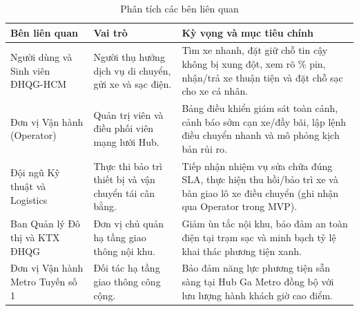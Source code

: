 \begin{table}[H]
\centering
\caption{Phân tích các bên liên quan}
\label{tab:stakeholders}
\begin{tabularx}{\textwidth}{>{\raggedright\arraybackslash}p{3.7cm} >{\raggedright\arraybackslash}p{4.3cm} >{\raggedright\arraybackslash}X}
\toprule
\textbf{Bên liên quan} & \textbf{Vai trò} & \textbf{Kỳ vọng và mục tiêu chính} \\
\midrule
Người dùng và Sinh viên ĐHQG-HCM & Người thụ hưởng dịch vụ di chuyển, gửi xe và sạc điện. & Tìm xe nhanh, đặt giữ chỗ tin cậy không bị xung đột, xem rõ \% pin, nhận/trả xe thuận tiện và đặt chỗ sạc cho xe cá nhân. \\
\addlinespace[3pt]
Đơn vị Vận hành (Operator) & Quản trị viên và điều phối viên mạng lưới Hub. & Bảng điều khiển giám sát toàn cảnh, cảnh báo sớm cạn xe/đầy bãi, lập lệnh điều chuyển nhanh và mô phỏng kịch bản rủi ro. \\
\addlinespace[3pt]
Đội ngũ Kỹ thuật và Logistics & Thực thi bảo trì thiết bị và vận chuyển tái cân bằng. & Tiếp nhận nhiệm vụ sửa chữa đúng SLA, thực hiện thu hồi/bảo trì xe và bàn giao lô xe điều chuyển (ghi nhận qua Operator trong MVP). \\
\addlinespace[3pt]
Ban Quản lý Đô thị và KTX ĐHQG & Đơn vị chủ quản hạ tầng giao thông nội khu. & Giảm ùn tắc nội khu, bảo đảm an toàn điện tại trạm sạc và minh bạch tỷ lệ khai thác phương tiện xanh. \\
\addlinespace[3pt]
Đơn vị Vận hành Metro Tuyến số 1 & Đối tác hạ tầng giao thông công cộng. & Bảo đảm năng lực phương tiện sẵn sàng tại Hub Ga Metro đồng bộ với lưu lượng hành khách giờ cao điểm. \\
\bottomrule
\end{tabularx}
\end{table}

